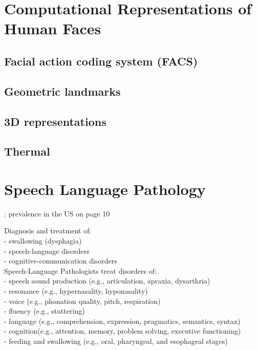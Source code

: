 \section{Computational Representations of Human Faces}

\subsection{Facial action coding system (FACS)}




\subsection{Geometric landmarks}

\subsection{3D representations}

\subsection{Thermal}


\section{Speech Language Pathology}
\label{sec:SLP}
\cite{SLPathologies}: prevalence in the US on page 10

Diagnosis and treatment of:\\
- swallowing (dysphagia) \\
- speech-language disorders\\
- cognitive-communication disorders\\


Speech-Language Pathologists treat disorders of:\\
- speech sound production (e.g., articulation, apraxia, dysarthria)\\
- resonance (e.g., hypernasality, hyponasality)\\
- voice (e.g., phonation quality, pitch, respiration)\\
- fluency (e.g., stuttering)\\
- language (e.g., comprehension, expression, pragmatics, semantics, syntax)\\
- cognition(e.g., attention, memory, problem solving, executive functioning)\\
- feeding and swallowing (e.g., oral, pharyngeal, and esophageal stages) \\

